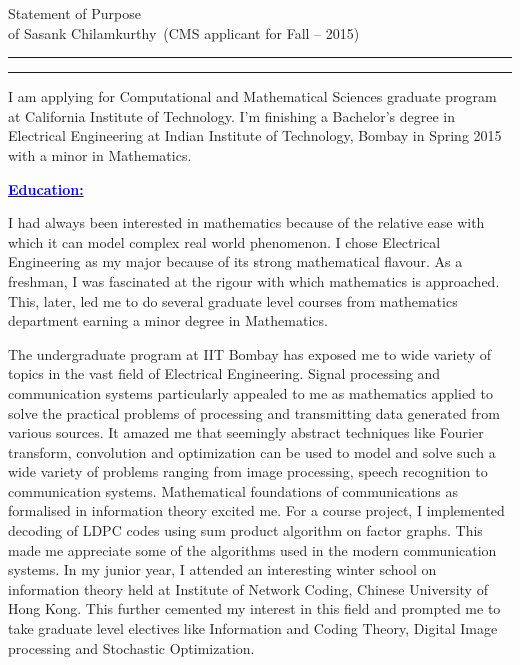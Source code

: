 \documentclass[11pt]{article}
\newcommand{\soptitle}{Statement of Purpose}
\newcommand{\yourname}{Sasank Chilamkurthy}
\newcommand{\statement}[1]{\par\medskip
  \underline{\textcolor{blue}{\textbf{#1:}}}\space
}
\begin{document}
\begin{center}
\LARGE\soptitle\\
\large of \yourname\ (CMS applicant for Fall -- 2015)
\end{center}

\hrule
\vspace{1pt}
\hrule height 1pt

\bigskip
I am applying for Computational and Mathematical Sciences graduate program at California Institute of Technology. 
I'm finishing a Bachelor's degree in Electrical Engineering at Indian Institute of Technology, Bombay in Spring 2015
with a minor in Mathematics.
\statement{Education}
I had always been interested in mathematics because of the relative ease with which it can model complex real world phenomenon. 
I chose Electrical Engineering as my major because of its strong mathematical flavour. 
As a freshman, I was fascinated at the rigour with which mathematics is approached. 
This, later, led me to do several graduate level courses from mathematics department earning a minor degree in Mathematics. 

The undergraduate program at IIT Bombay has exposed me to wide variety of topics in the vast field of Electrical Engineering. 
Signal processing and communication systems particularly appealed to me as mathematics applied to solve the practical problems of processing and transmitting data generated from various sources. 
It amazed me that seemingly abstract techniques like Fourier transform, convolution and optimization can be used to model and solve such a wide variety of problems ranging from image processing, speech recognition to communication systems.
Mathematical foundations of communications as formalised in information theory excited me. 
For a course project, I implemented decoding of LDPC codes using sum product algorithm on factor graphs. 
This made me appreciate some of the algorithms used in the modern communication systems. 
In my junior year, I attended an interesting winter school on information theory held at Institute of Network Coding, Chinese University of Hong Kong. 
This further cemented my interest in this field and prompted me to take graduate level electives like Information and Coding Theory, Digital Image processing and Stochastic Optimization.
\end{document}

